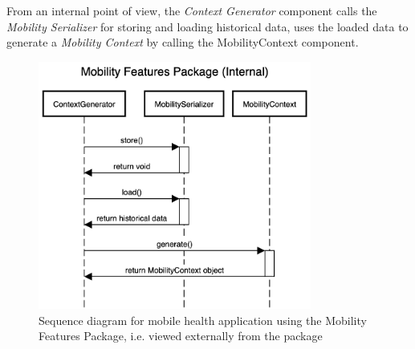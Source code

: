 From an internal point of view, the \textit{Context Generator} component calls the \textit{Mobility Serializer} for storing and loading historical data, uses the loaded data to generate a \textit{Mobility Context} by calling the MobilityContext component.
\begin{figure}[h]
\centering
\includegraphics[width=0.8\textwidth]{images/diagrams/sequence-internal.png}
\caption{Sequence diagram for mobile health application using the Mobility Features Package, i.e. viewed externally from the package}
\label{fig:sequence-diagram-external}
\end{figure}